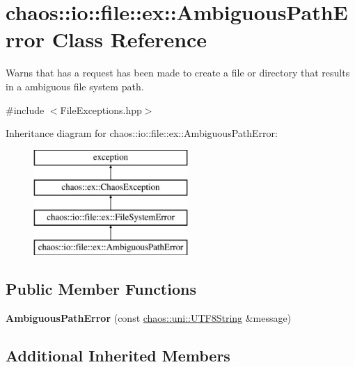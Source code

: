 \hypertarget{classchaos_1_1io_1_1file_1_1ex_1_1_ambiguous_path_error}{}\section{chaos\+:\+:io\+:\+:file\+:\+:ex\+:\+:Ambiguous\+Path\+Error Class Reference}
\label{classchaos_1_1io_1_1file_1_1ex_1_1_ambiguous_path_error}


Warns that has a request has been made to create a file or directory that results in a ambiguous file system path.  




{\ttfamily \#include $<$File\+Exceptions.\+hpp$>$}

Inheritance diagram for chaos\+:\+:io\+:\+:file\+:\+:ex\+:\+:Ambiguous\+Path\+Error\+:\begin{figure}[H]
\begin{center}
\leavevmode
\includegraphics[height=4.000000cm]{classchaos_1_1io_1_1file_1_1ex_1_1_ambiguous_path_error}
\end{center}
\end{figure}
\subsection*{Public Member Functions}
\begin{DoxyCompactItemize}
\item 
\hypertarget{classchaos_1_1io_1_1file_1_1ex_1_1_ambiguous_path_error_ac10d0f67ac33f603226c32bfcd98253d}{}{\bfseries Ambiguous\+Path\+Error} (const \hyperlink{classchaos_1_1uni_1_1_u_t_f8_string}{chaos\+::uni\+::\+U\+T\+F8\+String} \&message)\label{classchaos_1_1io_1_1file_1_1ex_1_1_ambiguous_path_error_ac10d0f67ac33f603226c32bfcd98253d}

\end{DoxyCompactItemize}
\subsection*{Additional Inherited Members}


